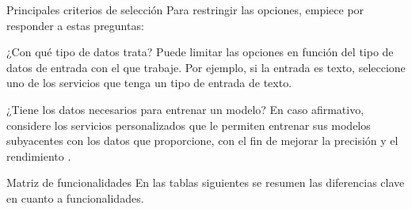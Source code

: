 Principales criterios de selección
Para restringir las opciones, empiece por responder a estas preguntas:

¿Con qué tipo de datos trata? Puede limitar las opciones en función del tipo de datos de entrada con el que trabaje. Por ejemplo, si la entrada es texto, seleccione uno de los servicios que tenga un tipo de entrada de texto.

¿Tiene los datos necesarios para entrenar un modelo? En caso afirmativo, considere los servicios personalizados que le permiten entrenar sus modelos subyacentes con los datos que proporcione, con el fin de mejorar la precisión y el rendimiento \cite{Blanco}.

Matriz de funcionalidades
En las tablas siguientes se resumen las diferencias clave en cuanto a funcionalidades.

